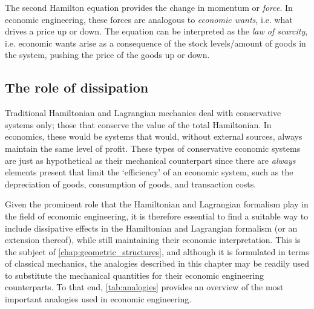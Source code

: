 The second Hamilton equation provides the change in momentum or \emph{force}. In economic engineering, these forces are analogous to \emph{economic wants}, i.e. what drives a price up or down. The equation can be interpreted as the \emph{law of scarcity}, i.e. economic wants arise as a consequence of the stock levels/amount of goods in the system, pushing the price of the goods up or down.

\subsection{The role of dissipation} 
Traditional Hamiltonian and Lagrangian mechanics deal with conservative systems only; those that conserve the value of the total Hamiltonian. In economics, these would be systems that would, without external sources, always maintain the same level of profit. These types of conservative economic systems are just as hypothetical as their mechanical counterpart since there are \emph{always} elements present that limit the `efficiency' of an economic system, such as the depreciation of goods, consumption of goods, and transaction costs. 

Given the prominent role that the Hamiltonian and Lagrangian formalism play in the field of economic engineering, it is therefore essential to find a suitable way to include dissipative effects in the Hamiltonian and Lagrangian formalism (or an extension thereof), while still maintaining their economic interpretation. This is the subject of \cref{chap:geometric_structures}, and although it is formulated in terms of classical mechanics, the analogies described in this chapter may be readily used to substitute the mechanical quantities for their economic engineering counterparts. To that end, \cref{tab:analogies} provides an overview of the most important analogies used in economic engineering.


